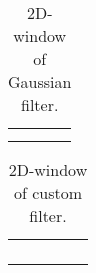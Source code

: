 
\begin{table}[ht]
    \centering
    \begin{tabular}{|c|c|c|}
        \hline
        \cellcolor{blue!75} & \cellcolor{blue!75} & \cellcolor{blue!75} \\
        \hline
        \cellcolor{blue!75} & \cellcolor{cyan!25} & \cellcolor{blue!75} \\
        \hline
        \cellcolor{blue!75} & \cellcolor{blue!75} & \cellcolor{magenta!75} \\
        \hline
    \end{tabular}
    \caption{2D-window of Gaussian filter.} 
    \label{table:appropriate-label}
\end{table}

\begin{table}[ht]
    \centering
    \begin{tabular}{|c|c|c|c|c|}
        \hline
        \cellcolor{blue!75} & & & & \cellcolor{blue!75} \\
        \hline
        & \cellcolor{blue!75} & & \cellcolor{blue!75} & \\
        \hline
        & & \cellcolor{blue!75} & & \\
        \hline
        & \cellcolor{blue!75} & & \cellcolor{blue!75} & \\
        \hline
        \cellcolor{blue!75} & & & \cellcolor{red!75} & \cellcolor{blue!75} \\
        \hline
    \end{tabular}
    \caption{2D-window of custom filter.} 
    \label{table:appropriate-label}
\end{table}
